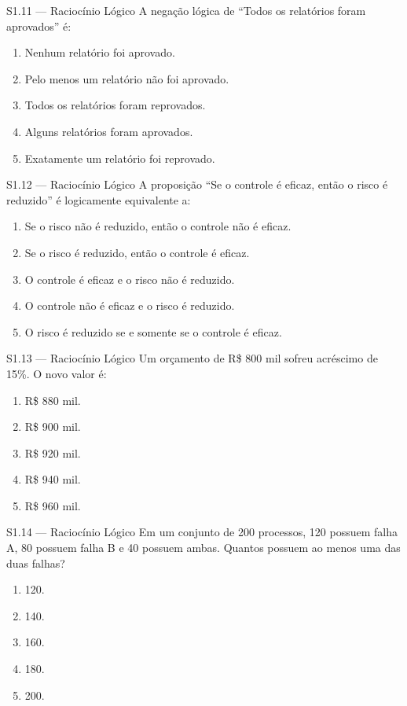 \begin{questao}{S1.11 — Raciocínio Lógico}
A negação lógica de ``Todos os relatórios foram aprovados'' é:
\begin{enumerate}[label=\Alph*)]
\item Nenhum relatório foi aprovado.
\item Pelo menos um relatório não foi aprovado.
\item Todos os relatórios foram reprovados.
\item Alguns relatórios foram aprovados.
\item Exatamente um relatório foi reprovado.
\end{enumerate}
\end{questao}

\begin{questao}{S1.12 — Raciocínio Lógico}
A proposição ``Se o controle é eficaz, então o risco é reduzido'' é logicamente equivalente a:
\begin{enumerate}[label=\Alph*)]
\item Se o risco não é reduzido, então o controle não é eficaz.
\item Se o risco é reduzido, então o controle é eficaz.
\item O controle é eficaz e o risco não é reduzido.
\item O controle não é eficaz e o risco é reduzido.
\item O risco é reduzido se e somente se o controle é eficaz.
\end{enumerate}
\end{questao}

\begin{questao}{S1.13 — Raciocínio Lógico}
Um orçamento de R\$ 800 mil sofreu acréscimo de 15\%. O novo valor é:
\begin{enumerate}[label=\Alph*)]
\item R\$ 880 mil.
\item R\$ 900 mil.
\item R\$ 920 mil.
\item R\$ 940 mil.
\item R\$ 960 mil.
\end{enumerate}
\end{questao}

\begin{questao}{S1.14 — Raciocínio Lógico}
Em um conjunto de 200 processos, 120 possuem falha A, 80 possuem falha B e 40 possuem ambas. Quantos possuem ao menos uma das duas falhas?
\begin{enumerate}[label=\Alph*)]
\item 120.
\item 140.
\item 160.
\item 180.
\item 200.
\end{enumerate}
\end{questao}

